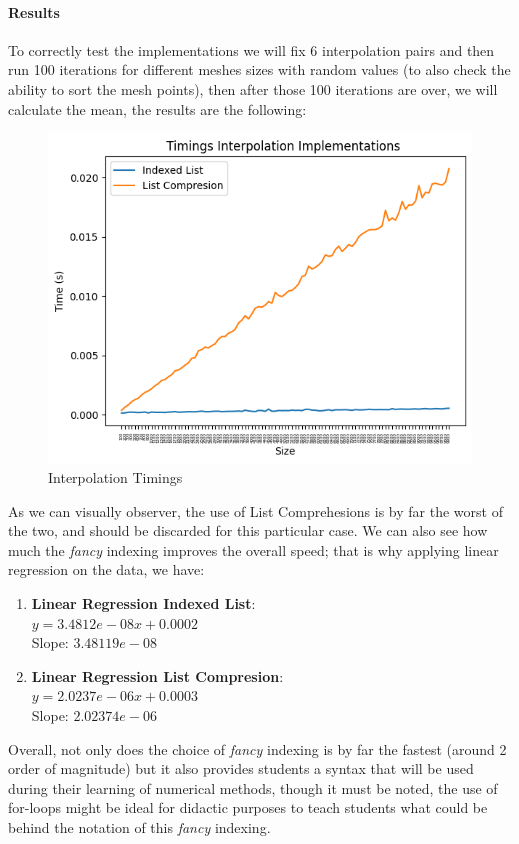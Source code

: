 \paragraph{Results}
To correctly test the implementations we will fix 6 interpolation pairs and then run 100 iterations for different meshes sizes with random values (to also check the ability to sort the mesh points), then after those 100 iterations are over, we will calculate the mean, the results are the following:
\begin{figure}[H]
    \centering
    \includegraphics[scale=0.9]{Include/Images/Thesis/Analysis of Solutions/Interpolation/Interpolation Timings.png}
    \caption{Interpolation Timings}
    \label{fig:Interpolation Timings}
\end{figure}

As we can visually observer, the use of List Comprehesions is by far the worst of the two, and should be discarded for this particular case. We can also see how much the \textit{fancy} indexing improves the overall speed; that is why applying linear regression on the data, we have:
\begin{enumerate}
    \item \textbf{Linear Regression Indexed List}: \\
        $y = 3.4812e-08x + 0.0002$ \\
        Slope: $3.48119e-08$
    \item \textbf{Linear Regression List Compresion}: \\
        $y = 2.0237e-06x + 0.0003$ \\
        Slope: $2.02374e-06$
\end{enumerate}

Overall, not only does the choice of \textit{fancy} indexing is by far the fastest (around 2 order of magnitude) but it also provides students a syntax that will be used during their learning of numerical methods, though it must be noted, the use of for-loops might be ideal for didactic purposes to teach students what could be behind the notation of this \textit{fancy} indexing.




